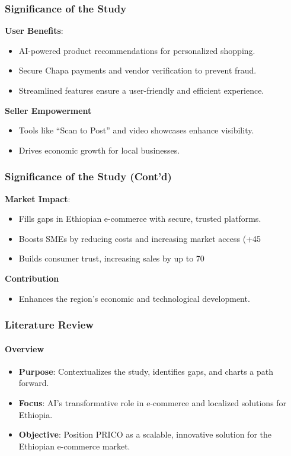 \documentclass{beamer}
\begin{document}
\begin{frame}
	\frametitle{Significance of the Study}
	\textbf{User Benefits}:
	\begin{itemize}
		\item AI-powered product recommendations for personalized shopping.
		\item Secure Chapa payments and vendor verification to prevent fraud.
		\item Streamlined features ensure a user-friendly and efficient experience.
	\end{itemize}
	\textbf{Seller Empowerment}
	\begin{itemize}
		\item Tools like “Scan to Post” and video showcases enhance visibility.
		\item Drives economic growth for local businesses.
	\end{itemize}
\end{frame}

\begin{frame}
	\frametitle{Significance of the Study (Cont'd)}
	\textbf{Market Impact}:
	\begin{itemize}
		\item Fills gaps in Ethiopian e-commerce with secure, trusted platforms.
		\item Boosts SMEs by reducing costs and increasing market access (+45%
		\item Builds consumer trust, increasing sales by up to 70%
	\end{itemize}
	\textbf{Contribution}
	\begin{itemize}
		\item Enhances the region's economic and technological development.
	\end{itemize}
\end{frame}

\begin{frame}
	\frametitle{Literature Review}
	\framesubtitle{Overview}
	\begin{itemize}
		\item\textbf{Purpose}: Contextualizes the study, identifies gaps, and charts a path forward.
		\item\textbf{Focus}: AI's transformative role in e-commerce and localized solutions for Ethiopia.
		\item\textbf{Objective}: Position PRICO as a scalable, innovative solution for the Ethiopian e-commerce market.
	\end{itemize}
\end{frame}
\end{document}

